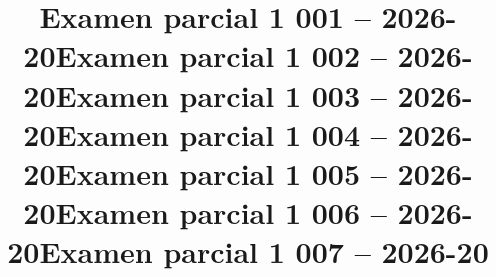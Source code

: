\documentclass{exam}
\title{Examen parcial 1 001 -- 2026-20}
\begin{document}
\makeexamheader


\newpage
\programmingGrid
\newpage

\newpage

\newpage

\cleartoeven
\setcounter{questioncounter}{0}
\setcounter{page}{1}
\title{Examen parcial 1 002 -- 2026-20}
\makeexamheader


\newpage

\newpage

\newpage
\programmingGrid
\newpage

\cleartoeven
\setcounter{questioncounter}{0}
\setcounter{page}{1}
\title{Examen parcial 1 003 -- 2026-20}
\makeexamheader


\newpage

\newpage

\newpage
\programmingGrid
\newpage

\cleartoeven
\setcounter{questioncounter}{0}
\setcounter{page}{1}
\title{Examen parcial 1 004 -- 2026-20}
\makeexamheader


\newpage
\programmingGrid
\newpage

\newpage

\newpage

\cleartoeven
\setcounter{questioncounter}{0}
\setcounter{page}{1}
\title{Examen parcial 1 005 -- 2026-20}
\makeexamheader


\newpage
\programmingGrid
\newpage

\newpage

\newpage

\cleartoeven
\setcounter{questioncounter}{0}
\setcounter{page}{1}
\title{Examen parcial 1 006 -- 2026-20}
\makeexamheader


\newpage

\newpage

\newpage
\programmingGrid
\newpage

\cleartoeven
\setcounter{questioncounter}{0}
\setcounter{page}{1}
\title{Examen parcial 1 007 -- 2026-20}
\makeexamheader


\newpage

\newpage

\newpage
\programmingGrid
\newpage
\end{document}
